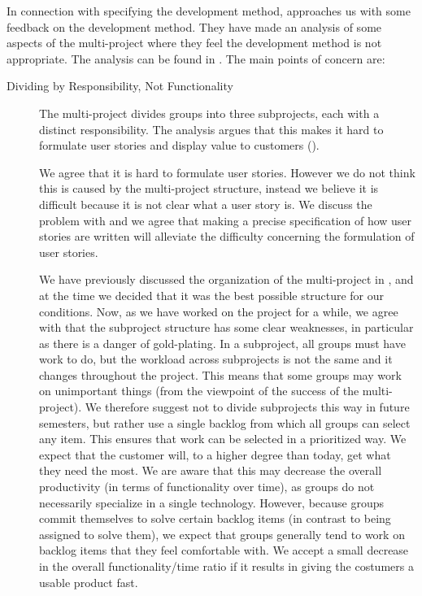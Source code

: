 In connection with specifying the development method,  approaches us with some feedback on the development method. They have made an analysis of some aspects of the multi-project where they feel the development method is not appropriate. The analysis can be found in . The main points of concern are:
\begin{description}
  \item[Dividing by Responsibility, Not Functionality] The multi-project divides groups into three subprojects, each with a distinct responsibility. The analysis argues that this makes it hard to formulate user stories and display value to customers ().

  We agree that it is hard to formulate user stories. However we do not think this is caused by the multi-project structure, instead we believe it is difficult because it is not clear what a user story is. We discuss the problem with  and we agree that making a precise specification of how user stories are written will alleviate the difficulty concerning the formulation of user stories.

  We have previously discussed the organization of the multi-project in , and at the time we decided that it was the best possible structure for our conditions. Now, as we have worked on the project for a while, we agree with  that the subproject structure has some clear weaknesses, in particular as there is a danger of gold-plating. In a subproject, all groups must have work to do, but the workload across subprojects is not the same and it changes throughout the project. This means that some groups may work on unimportant things (from the viewpoint of the success of the multi-project). We therefore suggest not to divide subprojects this way in future semesters, but rather use a single backlog from which all groups can select any item. This ensures that work can be selected in a prioritized way. We expect that the customer will, to a higher degree than today, get what they need the most. We are aware that this may decrease the overall productivity (in terms of functionality over time), as groups do not necessarily specialize in a single technology. However, because groups commit themselves to solve certain backlog items (in contrast to being assigned to solve them), we expect that groups generally tend to work on backlog items that they feel comfortable with. We accept a small decrease in the overall functionality/time ratio if it results in giving the costumers a usable product fast.


\end{description}
